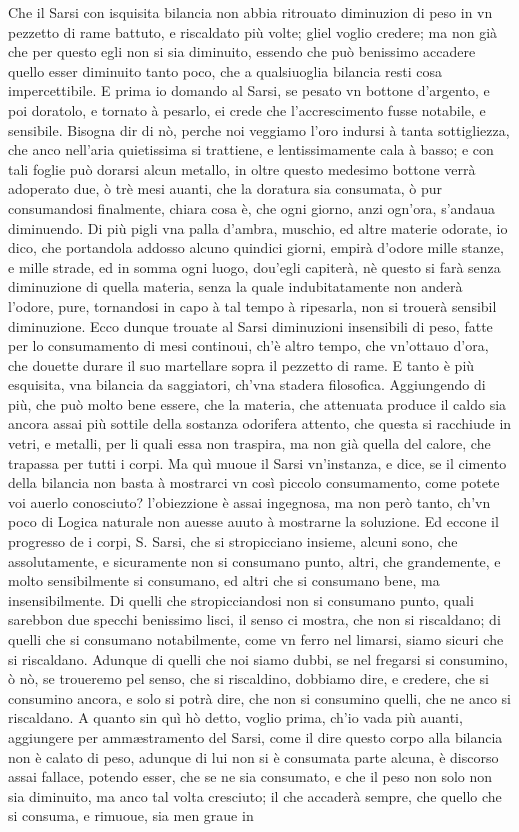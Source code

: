 \documentclass[11pt,twoside,openany]{book}
\begin{document}
Che il Sarsi con isquisita bilancia non abbia ritrouato diminuzion di peso in vn pezzetto di rame battuto, e riscaldato più volte; gliel voglio credere; ma non già che per questo egli non si sia diminuito, essendo che può benissimo accadere quello esser diminuito tanto poco, che a qualsiuoglia bilancia resti cosa impercettibile. E prima io domando al Sarsi, se pesato vn bottone d'argento, e poi doratolo, e tornato à pesarlo, ei crede che l'accrescimento fusse notabile, e sensibile. Bisogna dir di nò, perche noi veggiamo l'oro indursi à tanta sottigliezza, che anco nell'aria quietissima si trattiene, e lentissimamente cala à basso; e con tali foglie può dorarsi alcun metallo, in oltre questo medesimo bottone verrà adoperato due, ò trè mesi auanti, che la doratura sia consumata, ò pur consumandosi finalmente, chiara cosa è, che ogni giorno, anzi ogn'ora, s'andaua diminuendo. Di più pigli vna palla d'ambra, muschio, ed altre materie odorate, io dico, che portandola addosso alcuno quindici giorni, empirà d'odore mille stanze, e mille strade, ed in somma ogni luogo, dou'egli capiterà, nè questo si farà senza diminuzione di quella materia, senza la quale indubitatamente non anderà l'odore, pure, tornandosi in capo à tal tempo à ripesarla, non si trouerà sensibil diminuzione. Ecco dunque trouate al Sarsi diminuzioni insensibili di peso, fatte per lo consumamento di mesi continoui, ch'è altro tempo, che vn'ottauo d'ora, che douette durare il suo martellare sopra il pezzetto di rame. E tanto è più esquisita, vna bilancia da saggiatori, ch'vna stadera filosofica. Aggiungendo di più, che può molto bene essere, che la materia, che attenuata produce il caldo sia ancora assai più sottile della sostanza odorifera attento, che questa si racchiude in vetri, e metalli, per li quali essa non traspira, ma non già quella del calore, che trapassa per tutti i corpi. Ma quì muoue il Sarsi vn'instanza, e dice, se il cimento della bilancia non basta à mostrarci vn così piccolo consumamento, come potete voi auerlo conosciuto? l'obiezzione è assai ingegnosa, ma non però tanto, ch'vn poco di Logica naturale non auesse auuto à mostrarne la soluzione. Ed eccone il progresso de i corpi, S. Sarsi, che si stropicciano insieme, alcuni sono, che assolutamente, e sicuramente non si consumano punto, altri, che grandemente, e molto sensibilmente si consumano, ed altri che si consumano bene, ma insensibilmente. Di quelli che stropicciandosi non si consumano punto, quali sarebbon due specchi benissimo lisci, il senso ci mostra, che non si riscaldano; di quelli che si consumano notabilmente, come vn ferro nel limarsi, siamo sicuri che si riscaldano. Adunque di quelli che noi siamo dubbi, se nel fregarsi si consumino, ò nò, se troueremo pel senso, che si riscaldino, dobbiamo dire, e credere, che si consumino ancora, e solo si potrà dire, che non si consumino quelli, che ne anco si riscaldano. A quanto sin quì hò detto, voglio prima, ch'io vada più auanti, aggiungere per ammæstramento del Sarsi, come il dire questo corpo alla bilancia non è calato di peso, adunque di lui non si è consumata parte alcuna, è discorso assai fallace, potendo esser, che se ne sia consumato, e che il peso non solo non sia diminuito, ma anco tal volta cresciuto; il che accaderà sempre, che quello che si consuma, e rimuoue, sia men graue in 
\end{document}
